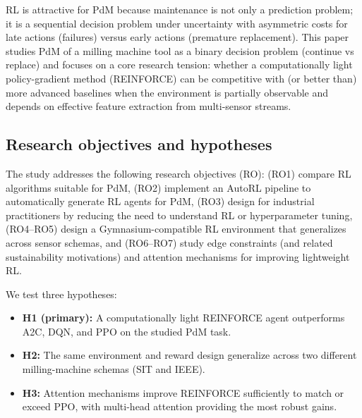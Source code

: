 \documentclass[11pt]{article}
\begin{document}
RL is attractive for PdM because maintenance is not only a prediction problem; it is a sequential decision problem under uncertainty with asymmetric costs for late actions (failures) versus early actions (premature replacement). This paper studies PdM of a milling machine tool as a binary decision problem (continue vs replace) and focuses on a core research tension: whether a computationally light policy-gradient method (REINFORCE) can be competitive with (or better than) more advanced baselines when the environment is partially observable and depends on effective feature extraction from multi-sensor streams.

\subsection{Research objectives and hypotheses}
The study addresses the following research objectives (RO): (RO1) compare RL algorithms suitable for PdM, (RO2) implement an AutoRL pipeline to automatically generate RL agents for PdM, (RO3) design for industrial practitioners by reducing the need to understand RL or hyperparameter tuning, (RO4--RO5) design a Gymnasium-compatible RL environment that generalizes across sensor schemas, and (RO6--RO7) study edge constraints (and related sustainability motivations) and attention mechanisms for improving lightweight RL.

We test three hypotheses:
\begin{itemize}
	\item \textbf{H1 (primary):} A computationally light REINFORCE agent outperforms A2C, DQN, and PPO on the studied PdM task.
	\item \textbf{H2:} The same environment and reward design generalize across two different milling-machine schemas (SIT and IEEE).
	\item \textbf{H3:} Attention mechanisms improve REINFORCE sufficiently to match or exceed PPO, with multi-head attention providing the most robust gains.
\end{itemize}
\end{document}
